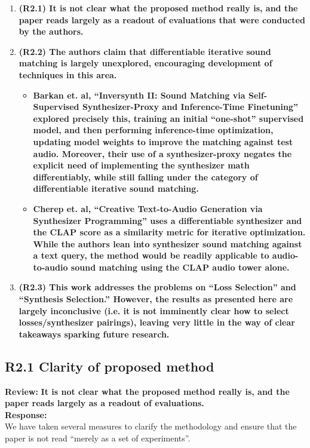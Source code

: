 \documentclass[11pt]{article}
\begin{document}
\begin{enumerate}
  \item \textbf{(R2.1) It is not clear what the proposed method really is, and the paper reads largely as a readout of evaluations that were conducted by the authors.}  
  \item \textbf{(R2.2) The authors claim that differentiable iterative sound matching is largely unexplored, encouraging development of techniques in this area.}  
    \begin{itemize}
      \item \textbf{Barkan et. al, ``Inversynth II: Sound Matching via Self-Supervised Synthesizer-Proxy and Inference-Time Finetuning'' explored precisely this, training an initial ``one-shot'' supervised model, and then performing inference-time optimization, updating model weights to improve the matching against test audio.  Moreover, their use of a synthesizer-proxy negates the explicit need of implementing the synthesizer math differentiably, while still falling under the category of differentiable iterative sound matching.}  
      \item \textbf{Cherep et. al, ``Creative Text-to-Audio Generation via Synthesizer Programming'' uses a differentiable synthesizer and the CLAP score as a similarity metric for iterative optimization.  While the authors lean into synthesizer sound matching against a text query, the method would be readily applicable to audio-to-audio sound matching using the CLAP audio tower alone.}  
    \end{itemize}
  \item \textbf{(R2.3) This work addresses the problems on ``Loss Selection'' and ``Synthesis Selection.''  However, the results as presented here are largely inconclusive (i.e. it is not imminently clear how to select losses/synthesizer pairings), leaving very little in the way of clear takeaways sparking future research.}
\end{enumerate}

\subsection{R2.1 Clarity of proposed method}
\label{R2.1}
\noindent\textbf{Review:}
\noindent \textbf{It is not clear what the proposed method really is, and the paper reads largely as a readout of evaluations. } 
\\

\noindent\textbf{Response:} \\
We have taken several measures to clarify the methodology and ensure that the paper is not read ``merely as a set of experiments''.  
\end{document}

